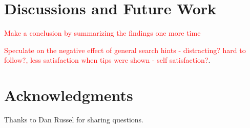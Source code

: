 \documentclass{sig-alternate}
\newcommand\todo[1]{\textcolor{red}{#1}}
\begin{document}
\section{Discussions and Future Work}
\todo{Make a conclusion by summarizing the findings one more time}

\todo{Speculate on the negative effect of general search hints - distracting? hard to follow?, less satisfaction when tips were shown - self satisfaction?}. 

\section{Acknowledgments}
Thanks to Dan Russel for sharing questions.

%

%
%
\end{document}
